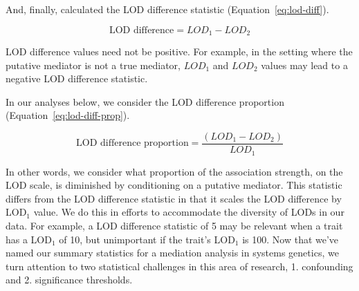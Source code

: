 \documentclass[oneside]{book}\usepackage[]{graphicx}\usepackage[]{color}
\begin{document}
And, finally, \citet{chick2016defining} calculated the LOD difference statistic (Equation~\ref{eq:lod-diff}).

\begin{equation}
\text{LOD difference} = LOD_1 - LOD_2\label{eq:lod-diff}
\end{equation}

LOD difference values need not be positive. 
For example, in the setting where the putative mediator is not a true mediator, $LOD_1$ and $LOD_2$ values may lead to a negative LOD difference statistic. 

In our analyses below, we consider the LOD difference proportion (Equation~\ref{eq:lod-diff-prop}).

\begin{equation}
\text{LOD difference proportion} = \frac{(LOD_1 - LOD_2)}{LOD_1}
\label{eq:lod-diff-prop}
\end{equation}

In other words, we consider what proportion of the association strength, on the LOD scale, is diminished by conditioning on a putative mediator. 
This statistic differs from the LOD difference statistic in that it scales the LOD difference by LOD$_1$ value. 
We do this in efforts to accommodate the diversity of LODs in our data. 
For example, a LOD difference statistic of 5 may be relevant when 
a trait has a LOD$_1$ of 10, but unimportant if the trait's LOD$_1$ is 100. Now that we've named our summary statistics for a mediation analysis in systems genetics, we turn attention to two statistical challenges in this area of research, 1. confounding and 2. significance thresholds.











\end{document}
